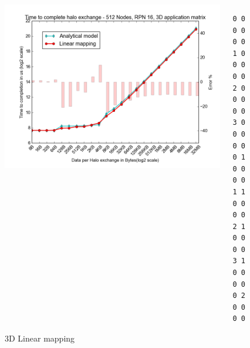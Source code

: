 \documentclass{beamer}
\begin{document}
\begin{frame}[fragile]
\begin{figure}
\caption{3D Linear mapping}
\begin{columns}
  \begin{column}{0.6\textwidth}
    \includegraphics[width=1\textwidth]{../mappings/3d_linear.png}
  \end{column}
  \begin{column}{0.3\textwidth}
\lstset{title=Mapping sample}
\begin{lstlisting}[basicstyle=\footnotesize\ttfamily, frame=lines,columns=fixed]
0 0 0 0 0 0
1 0 0 0 0 0
2 0 0 0 0 0
3 0 0 0 0 0
0 1 0 0 0 0
1 1 0 0 0 0
2 1 0 0 0 0
3 1 0 0 0 0
0 2 0 0 0 0
\end{lstlisting}
  \end{column}

\end{columns}
\end{figure}
\end{frame}
\end{document}

